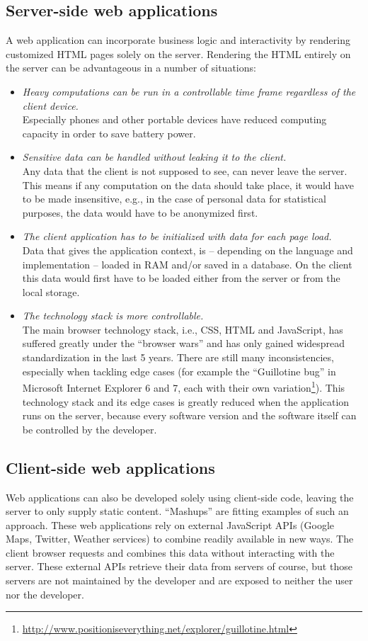 \documentclass[thesis.tex]{subfiles}
\begin{document}
\subsection{Server-side web applications}
A web application can incorporate business logic and interactivity by rendering
customized HTML pages solely on the server.
Rendering the HTML entirely on the server can be advantageous in a number of
situations:
\begin{itemize}
	\label{list:server-side-arguments}
	\item \emph{Heavy computations can be run in a controllable time frame
	regardless of the client device.}\\
		Especially phones and other portable devices have reduced computing
		capacity in order to save battery power.
	\item \emph{Sensitive data can be handled without leaking it to the
	client.}\\
		Any data that the client is not supposed to see, can never leave the
		server. This means if any computation on the data should take place,
		it would have to be made insensitive, e.g., in the case of personal data
		for statistical purposes, the data would have to be anonymized first.
	\item \emph{The client application has to be initialized with data for each
	page load.}\\
		Data that gives the application context, is -- depending on the language
		and implementation -- loaded in RAM and/or saved in a database. On the
		client this data would first have to be loaded either from the server or
		from the local storage.
	\item \emph{The technology stack is more controllable.}\\
		The main browser technology stack, i.e., CSS, HTML and JavaScript,
		has suffered greatly under the ``browser wars'' 
		and has only gained widespread standardization in the last 5 years.
		There are still many inconsistencies, especially when tackling edge cases
		(for example the ``Guillotine bug'' in Microsoft Internet Explorer 6 and 7,
		each with their own variation\footnote{\url{http://www.positioniseverything.net/explorer/guillotine.html}}).
		This technology stack and its edge cases is greatly reduced when
		the application runs on the server, because every software version and
		the software itself can be controlled by the developer.
\end{itemize}

\subsection{Client-side web applications}
Web applications can also be developed solely using client-side code,
leaving the server to only supply static content.
``Mashups'' are fitting examples of such an approach.
These web applications rely on external JavaScript APIs
(Google Maps, Twitter, Weather services) to combine readily available in new
ways. The client browser requests and combines this data without interacting
with the server. These external APIs retrieve their data from servers of course,
but those servers are not maintained by the developer and are exposed to neither
the user nor the developer.
\end{document}
